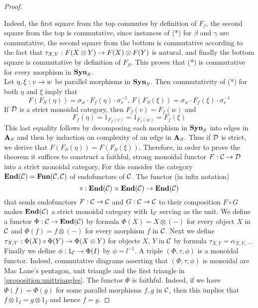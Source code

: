 \begin{proof}
\begin{center}
\end{center}
Indeed, the first square from the top commutes by definition of $F_f$, the second square from the top is commutative, since instances of (*) for $\beta$ and $\gamma$ are commutative, the second square from the bottom is commutative according to the fact that $\tau_{X,Y}:F(X\otimes Y)\rightarrow F(X)\otimes F(Y)$ is natural, and finally the bottom square is commutative by definition of $F_S$. This proves that (*) is commutative for every morphism in $\mathbf{Syn}_S$.\\
Let $\eta, \xi:v\rightarrow w$ be parallel morphisms in $\mathbf{Syn}_S$. Then commutativity of (*) for both $\eta$ and $\xi$ imply that
$$F(F_S(\eta)) = \sigma_w\cdot F_f(\eta)\cdot \sigma_v^{-1},\,F(F_S(\xi)) = \sigma_w\cdot F_f(\xi)\cdot \sigma_v^{-1}$$
If ${\mathcal D}$ is a strict monoidal category, then $F_f(v) = F_f(w)$ and
$$F_f(\eta) = 1_{F_f(v)}=1_{F_f(w)}= F_f(\xi)$$
This last equality follows by decomposing each morphism in $\mathbf{Syn}_S$ into edges in $\mathbf{A}_S$ and then by induction on complexity of an edge in $\mathbf{A}_S$. Thus if ${\mathcal D}$ is strict, we derive that $F(F_S(\eta)) = F(F_S(\xi))$. Therefore, in order to prove the theorem it suffices to construct a faithful, strong monoidal functor $F:{\mathcal C}\rightarrow {\mathcal D}$ into a strict monoidal category. For this consider the category $\mathbf{End}({\mathcal C}) = \mathbf{Fun}({\mathcal C},{\mathcal C})$ of endofunctors of ${\mathcal C}$. The functor (in infix notation)
$$\circ:\mathbf{End}({\mathcal C})\times \mathbf{End}({\mathcal C})\rightarrow \mathbf{End}({\mathcal C})$$
that sends endofunctors $F:{\mathcal C}\rightarrow {\mathcal C}$ and $G:{\mathcal C}\rightarrow {\mathcal C}$ to their composition $F\circ G$ makes $\mathbf{End}({\mathcal C})$ a strict monoidal category with $1_{{\mathcal C}}$ serving as the unit. We define a functor $\Phi:{\mathcal C}\rightarrow \mathbf{End}({\mathcal C})$ by formula $\Phi(X) = X\otimes (-)$ for every object $X$ in ${\mathcal C}$ and $\Phi(f) = f \otimes (-)$ for every morphism $f$ in ${\mathcal C}$. Next we define $\tau_{X,Y}:\Phi(X)\circ \Phi(Y)\rightarrow \Phi(X\otimes Y)$ for objects $X$, $Y$ in ${\mathcal C}$ by formula $\tau_{X,Y} = \alpha_{X,Y,-}$. Finally we define $\phi:1_{{\mathcal C}}\rightarrow \Phi(I)$ by $\phi = l^{-1}$. A triple $(\Phi,\tau,\phi)$ is a monoidal functor. Indeed, commutative diagrams asserting that $(\Phi,\tau,\phi)$ is monoidal are Mac Lane's pentagon, unit triangle and the first triangle in \ref{proposition:unittriangles}. The functor $\Phi$ is faithful. Indeed, if we have $\Phi(f) = \Phi(g)$ for some parallel morphisms $f, g$ in ${\mathcal C}$, then this implies that $f\otimes 1_I = g\otimes 1_I$ and hence $f=g$.
\end{proof}

